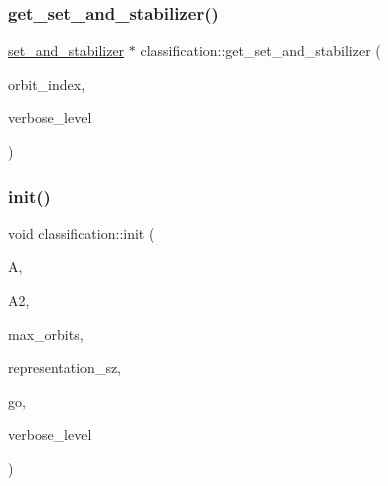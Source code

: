 \mbox{\label{classclassification_a1ab1ff0514a305dc9686448919598e87}} 
\subsubsection{\texorpdfstring{get\+\_\+set\+\_\+and\+\_\+stabilizer()}{get\_set\_and\_stabilizer()}}
{\footnotesize\ttfamily \mbox{\hyperlink{classset__and__stabilizer}{set\+\_\+and\+\_\+stabilizer}} $\ast$ classification\+::get\+\_\+set\+\_\+and\+\_\+stabilizer (\begin{DoxyParamCaption}\item[{\mbox{\hyperlink{galois_8h_a09fddde158a3a20bd2dcadb609de11dc}{I\+NT}}}]{orbit\+\_\+index,  }\item[{\mbox{\hyperlink{galois_8h_a09fddde158a3a20bd2dcadb609de11dc}{I\+NT}}}]{verbose\+\_\+level }\end{DoxyParamCaption})}

\mbox{\label{classclassification_ac299170ae2796ee29a2a509ec0641125}} 
\subsubsection{\texorpdfstring{init()}{init()}}
{\footnotesize\ttfamily void classification\+::init (\begin{DoxyParamCaption}\item[{\mbox{\hyperlink{classaction}{action}} $\ast$}]{A,  }\item[{\mbox{\hyperlink{classaction}{action}} $\ast$}]{A2,  }\item[{\mbox{\hyperlink{galois_8h_a09fddde158a3a20bd2dcadb609de11dc}{I\+NT}}}]{max\+\_\+orbits,  }\item[{\mbox{\hyperlink{galois_8h_a09fddde158a3a20bd2dcadb609de11dc}{I\+NT}}}]{representation\+\_\+sz,  }\item[{\mbox{\hyperlink{classlonginteger__object}{longinteger\+\_\+object}} \&}]{go,  }\item[{\mbox{\hyperlink{galois_8h_a09fddde158a3a20bd2dcadb609de11dc}{I\+NT}}}]{verbose\+\_\+level }\end{DoxyParamCaption})}

